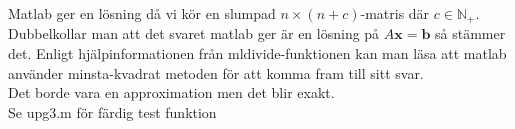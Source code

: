 Matlab ger en lösning då vi kör en slumpad $n\times (n+c)$-matris där $c\in\mathbb{N}_{+}$.
Dubbelkollar man att det svaret matlab ger är en lösning på $A\bm{x}=\bm{b}$ så stämmer det.
Enligt hjälpinformationen från mldivide-funktionen kan man läsa att matlab använder minsta-kvadrat metoden för att komma fram till sitt svar.\\
Det borde vara en approximation men det blir exakt.
\\
Se upg3.m för färdig test funktion